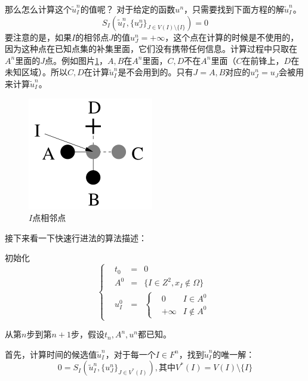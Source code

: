那么怎么计算这个$\widetilde{u}^n_I$的值呢？
对于给定的函数$u^n$，只需要找到下面方程的解$\widetilde{u}^n_I$。
\begin{equation}
    \label{solve_un}
    S_I(\widetilde{u}^n_I, \{u^n_J\}_{J \in V(I) \setminus \{I\}}) = 0
\end{equation}
要注意的是，如果$I$的相邻点$J$的值$u^n_J = +\infty$，这个点在计算的时候是不使用的，因为这种点在已知点集的补集里面，它们没有携带任何信息。计算过程中只取在$A^n$里面的$J$点。例如图片\ref{closer_points}，$A, B$在$A^n$里面，$C, D$不在$A^n$里面（$C$在前锋上，$D$在未知区域）。所以$C, D$在计算$\widetilde{u}^n_I$是不会用到的。只有$J = A, B$对应的$u^n_J = u_J$会被用来计算$\widetilde{u}^n_I$。
\begin{figure}[h!]
    \centering
    \includegraphics[width=150bp]{figure/closer_points.png}
    \caption{$I$点相邻点}
    \label{closer_points}
\end{figure}

接下来看一下快速行进法的算法描述：

初始化
\begin{equation*}
    \label{fmm_init}
    \left\{
    \begin{aligned}
    & t_0 & = & 0 \\
    & A^0 & = & \{I \in Z^2, x_I \notin \Omega\} \\
    & u^0_I & = & \left\{
        \begin{aligned}
        & 0 & I \in A^0 \\
        & +\infty & I \notin A^0
        \end{aligned}
        \right.
    \end{aligned}
    \right.
\end{equation*}

从第$n$步到第$n+1$步，假设$t_n, A^n, u^n$都已知。

首先，计算时间的候选值$\widetilde{u}^n_I$，对于每一个$I \in F^n$，找到$\widetilde{u}^n_I$的唯一解：
\begin{equation*}
    \label{uI_unique}
    0 = S_I(\widetilde{u}^n_I, \{u^n_J\}_{J \in V^*(I)}), \mbox{其中} V^*(I) = V(I) \setminus \{I\}
\end{equation*}

